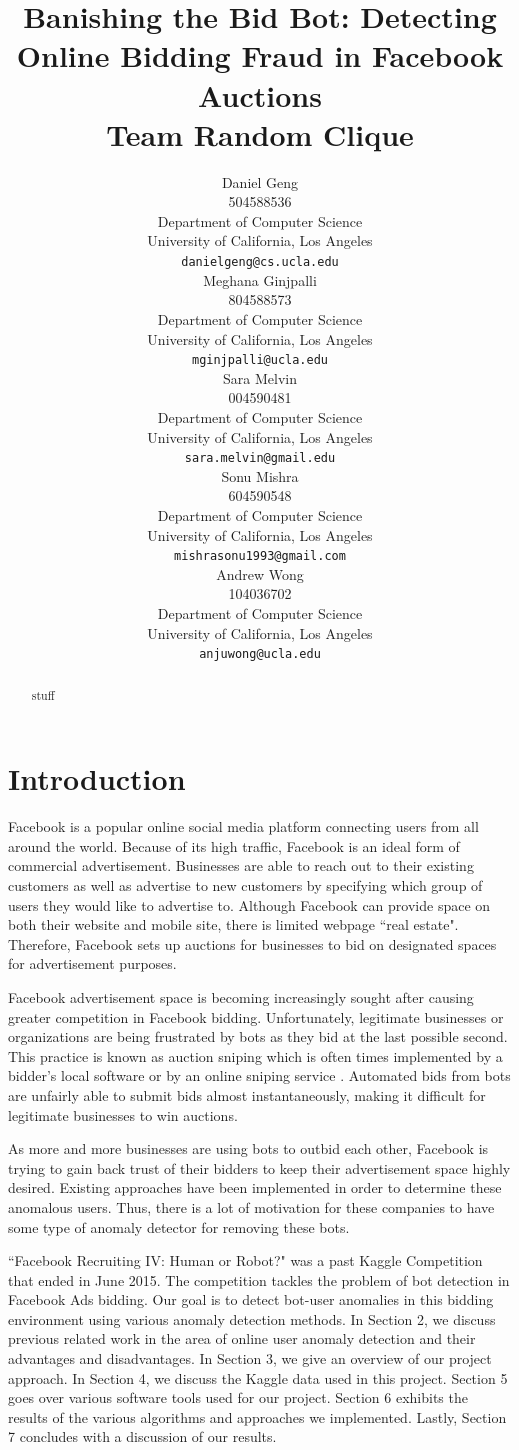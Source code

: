 \documentclass{article} %
\title{Banishing the Bid Bot: Detecting Online Bidding Fraud in Facebook Auctions \\ \large Team Random Clique}
\author{
Daniel Geng \\
504588536 \\
Department of Computer Science\\
University of California, Los Angeles\\
\texttt{danielgeng@cs.ucla.edu} \\
\And
Meghana Ginjpalli \\
804588573 \\
Department of Computer Science \\
University of California, Los Angeles\\
\texttt{mginjpalli@ucla.edu} \\
\AND
Sara Melvin \\
004590481 \\
Department of Computer Science \\
University of California, Los Angeles\\
\texttt{sara.melvin@gmail.edu} \\
\And
Sonu Mishra \\
604590548 \\
Department of Computer Science\\
University of California, Los Angeles\\
\texttt{mishrasonu1993@gmail.com} \\
\And
Andrew Wong \\
104036702 \\
Department of Computer Science\\
University of California, Los Angeles\\
\texttt{anjuwong@ucla.edu} \\
}
\begin{document}
\maketitle

\begin{abstract}

stuff

\end{abstract}

\section{Introduction}

Facebook is a popular online social media platform connecting users from all around the world.
Because of its high traffic, Facebook is an ideal form of commercial advertisement.
Businesses are able to reach out to their existing customers as well as advertise to new customers by specifying which group of users they would like to advertise to.
Although Facebook can provide space on both their website and mobile site, there is limited webpage ``real estate".
Therefore, Facebook sets up auctions for businesses to bid on designated spaces for advertisement purposes.

Facebook advertisement space is becoming increasingly sought after causing greater competition in Facebook bidding.
Unfortunately, legitimate businesses or organizations are being frustrated by bots as they bid at the last possible second. This practice is known as auction sniping which is often times implemented by a bidder's local software or by an online sniping service \cite{auction}.
Automated bids from bots are unfairly able to submit bids almost instantaneously, making it difficult for legitimate businesses to win auctions.

As more and more businesses are using bots to outbid each other, Facebook is trying to gain back trust of their bidders to keep their advertisement space highly desired. Existing approaches have been implemented in order to determine these anomalous users.
Thus, there is a lot of motivation for these companies to have some type of anomaly detector for removing these bots. 

``Facebook Recruiting IV: Human or Robot?" was a past Kaggle Competition that ended in June 2015.
The competition tackles the problem of bot detection in Facebook Ads bidding.
Our goal is to detect bot-user anomalies in this bidding environment using various anomaly detection methods.
In Section 2, we discuss previous related work in the area of online user anomaly detection and their advantages and disadvantages. In Section 3, we give an overview of our project approach. In Section 4, we discuss the Kaggle data used in this project. Section 5 goes over various software tools used for our project. Section 6 exhibits the results of the various algorithms and approaches we implemented. Lastly, Section 7 concludes with a discussion of our results.
\end{document}

